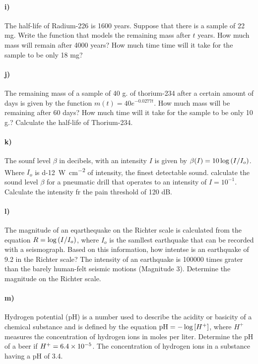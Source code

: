 \documentclass[../main.tex]{subfiles}
\begin{document}
\newpage


\paragraph{i)} The half-life of Radium-226 is 1600 years.
Suppose that there is a sample of 22 mg.
Write the function that models the remaining mass after $t$ years.
How much mass will remain after 4000 years?
How much time time will it take for the sample to be only 18 mg?

\newpage


\paragraph{j)} The remaining mass of a sample of 40 g. of thorium-234 after a certain amount of days is given by the function $m(t)=40e^{-0.0277t}$.
How much mass will be remaining after 60 days?
How much time will it take for the sample to be only 10 g.?
Calculate the half-life of Thorium-234.

\newpage


\paragraph{k)} The sounf level $\beta$ in decibels, with an intensity $I$ is given by $\beta\qty(I) = 10\log\qty(I/I_o)$.
Where $I_o$ is \SI{d-12}{\watt\per\centi\meter\squared} of intensity, the finest detectable sound.
calculate the sound level $\beta$ for a pneumatic drill that operates to an intensity of $I=10^{-1}$.
Calculate the intensity fr the pain threshold of 120 dB.

\newpage


\paragraph{l)} The magnitude of an eqarthequake on the Richter scale is calculated from the equation $R=\log\qty(I/I_o)$, where $I_o$ is the samllest earthquake that can be recorded with a seismograph.
Based on this information, how intentse is an earthquake of 9.2 in the Richter scale?
The intensity of an earthquake is \num{100000} times grater than the barely human-felt seismic motions (Magnitude 3).
Determine the magnitude on the Richter scale.

\newpage


\paragraph{m)} Hydrogen potential (pH) is a number used to describe the acidity or basicity of a chemical substance and is defined by the equation $\mathrm{pH}=-\log\qty[H^+]$, where $H^+$ measures the concentration of hydrogen ions in moles per liter.
Determine the pH of a beer if $H^+=\num{6.4d-5}$.
The concentration of hydrogen ions in a substance having a pH of 3.4.
\end{document}
